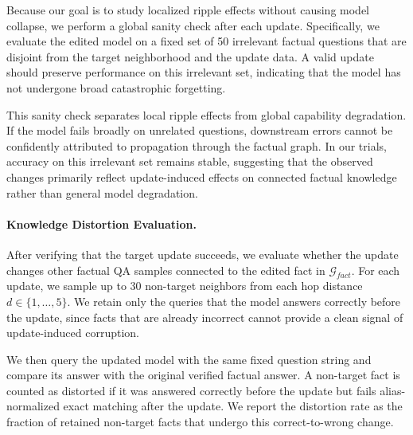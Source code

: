 Because our goal is to study localized ripple effects without causing model collapse, we perform a global sanity check after each update. Specifically, we evaluate the edited model on a fixed set of 50 irrelevant factual questions that are disjoint from the target neighborhood and the update data. A valid update should preserve performance on this irrelevant set, indicating that the model has not undergone broad catastrophic forgetting.

This sanity check separates local ripple effects from global capability degradation. If the model fails broadly on unrelated questions, downstream errors cannot be confidently attributed to propagation through the factual graph. In our trials, accuracy on this irrelevant set remains stable, suggesting that the observed changes primarily reflect update-induced effects on connected factual knowledge rather than general model degradation.


\paragraph{Knowledge Distortion Evaluation.}
After verifying that the target update succeeds, we evaluate whether the update changes other factual QA samples connected to the edited fact in $\mathcal{G}_{fact}$. For each update, we sample up to 30 non-target neighbors from each hop distance $d\in\{1,\ldots,5\}$. We retain only the queries that the model answers correctly before the update, since facts that are already incorrect cannot provide a clean signal of update-induced corruption.

We then query the updated model with the same fixed question string and compare its answer with the original verified factual answer. A non-target fact is counted as distorted if it was answered correctly before the update but fails alias-normalized exact matching after the update. We report the distortion rate as the fraction of retained non-target facts that undergo this correct-to-wrong change.

